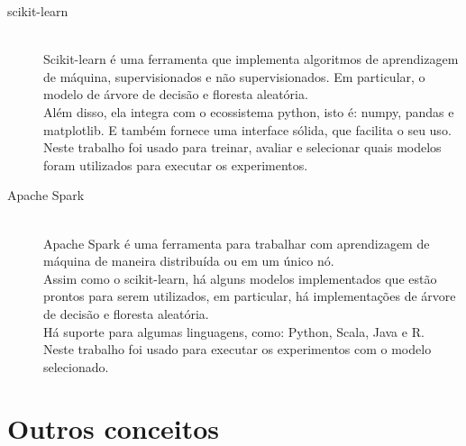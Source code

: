 \begin{description}
    \item[scikit-learn] \hfill \\ Scikit-learn é uma ferramenta que implementa algoritmos de aprendizagem
    de máquina, supervisionados e não supervisionados. Em particular, o modelo de árvore de decisão e floresta
    aleatória.\\ 
    Além disso, ela integra com o ecossistema python, isto é: numpy, pandas e matplotlib. E também 
    fornece uma interface sólida, que facilita o seu uso.  \\
    Neste trabalho foi usado para treinar, avaliar e selecionar quais modelos foram utilizados 
    para executar os experimentos.

    \item[Apache Spark] \hfill \\ Apache Spark é uma ferramenta para trabalhar com aprendizagem 
    de máquina de maneira distribuída ou em um único nó. \\
    Assim como o scikit-learn, há alguns modelos implementados que estão prontos para serem utilizados, 
    em particular, há implementações de árvore de decisão e floresta aleatória. \\
    Há suporte para algumas linguagens, como: Python, Scala, Java e R. \\
    Neste trabalho foi usado para executar os experimentos com o modelo selecionado.
\end{description}

\section{Outros conceitos}

